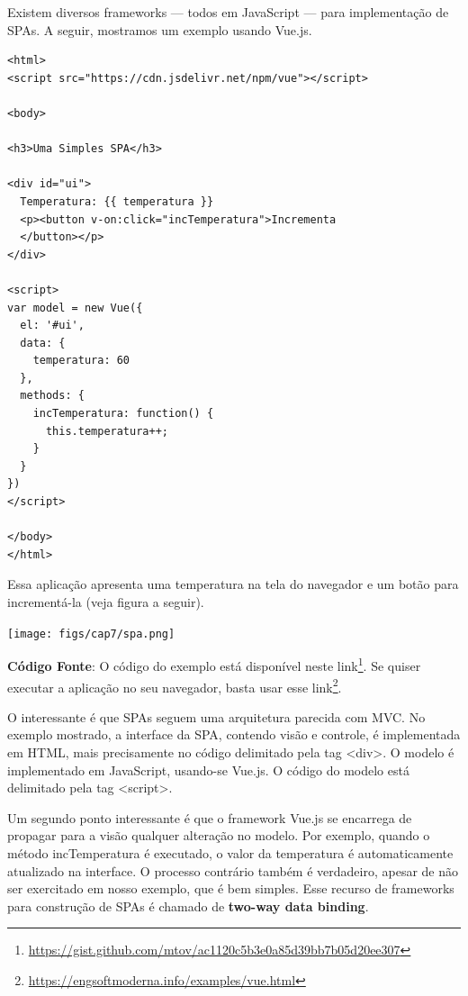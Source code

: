 \documentclass[
  11pt,
  twoside]{book}
\DeclareRobustCommand{\href}[2]{#2\footnote{\url{#1}}}
\let\origfigure\figure
\let\endorigfigure\endfigure
\renewenvironment{figure}[1][2] {
    \expandafter\origfigure\expandafter[!h]
} {
    \endorigfigure
}
\begin{document}
  Existem diversos frameworks --- todos
em JavaScript --- para implementação de SPAs. A seguir, mostramos um
exemplo usando Vue.js.

\begin{lstlisting}
<html>
<script src="https://cdn.jsdelivr.net/npm/vue"></script>

<body>

<h3>Uma Simples SPA</h3>

<div id="ui">
  Temperatura: {{ temperatura }}
  <p><button v-on:click="incTemperatura">Incrementa
  </button></p>
</div>

<script>
var model = new Vue({
  el: '#ui',
  data: {
    temperatura: 60
  },
  methods: {
    incTemperatura: function() {
      this.temperatura++;
    }
  }
})
</script>

</body>
</html>
\end{lstlisting}

Essa aplicação apresenta uma temperatura na tela do navegador e um botão
para incrementá-la (veja figura a seguir).

\begin{figure}
\centering
\texttt{[image: figs/cap7/spa.png]}
\caption{Interface da Single-Page Application do exemplo}
\end{figure}

\textbf{Código Fonte}: O código do exemplo está disponível neste
\href{https://gist.github.com/mtov/ac1120c5b3e0a85d39bb7b05d20ee307}{link}.
Se quiser executar a aplicação no seu navegador, basta usar esse
\href{https://engsoftmoderna.info/examples/vue.html}{link}.

O interessante é que SPAs seguem uma arquitetura parecida com MVC. No
exemplo mostrado, a interface da SPA, contendo visão e controle, é
implementada em HTML, mais precisamente no código delimitado pela tag
\textless div\textgreater. O modelo é implementado em JavaScript,
usando-se Vue.js. O código do modelo está delimitado pela tag
\textless script\textgreater.

 Um segundo ponto interessante é que o
framework Vue.js se encarrega de propagar para a visão qualquer
alteração no modelo. Por exemplo, quando o método incTemperatura é
executado, o valor da temperatura é automaticamente atualizado na
interface. O processo contrário também é verdadeiro, apesar de não ser
exercitado em nosso exemplo, que é bem simples. Esse recurso de
frameworks para construção de SPAs é chamado de \textbf{two-way data
binding}.
\end{document}

